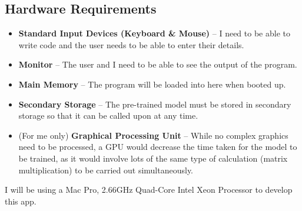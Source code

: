 \documentclass[12pt]{report}
\begin{document}
\subsection{Hardware Requirements}
\begin{itemize}
    \item \textbf{Standard Input Devices (Keyboard \& Mouse)} -- I need to be able to write code and the user needs to be able to enter their details.
    \item \textbf{Monitor} -- The user and I need to be able to see the output of the program.
    \item \textbf{Main Memory} -- The program will be loaded into here when booted up.
    \item \textbf{Secondary Storage} -- The pre-trained model must be stored in secondary storage so that it can be called upon at any time.
    \item (For me only) \textbf{Graphical Processing Unit} -- While no complex graphics need to be processed, a GPU would decrease the time taken for the model to be trained, as it would involve lots of the same type of calculation (matrix multiplication) to be carried out simultaneously.
\end{itemize}
I will be using a Mac Pro, 2.66GHz Quad-Core Intel Xeon Processor to develop this app.
\end{document}
